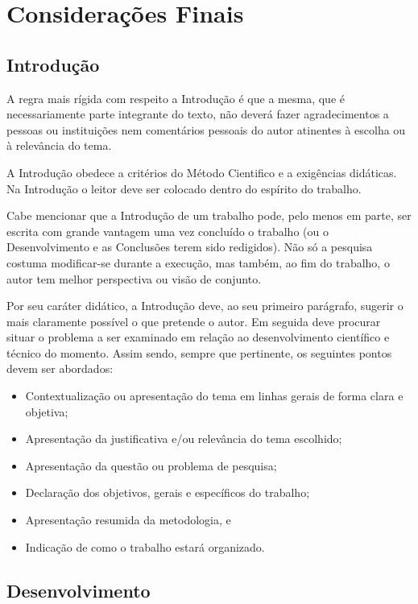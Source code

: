 \chapter[Considerações Finais]{Considerações Finais}

\section{Introdução}

A regra mais rígida com respeito a Introdução é que a mesma, que é 
necessariamente parte integrante do texto, não deverá fazer agradecimentos 
a pessoas ou instituições nem comentários pessoais do autor atinentes à 
escolha ou à relevância do tema.

A Introdução obedece a critérios do Método Cientifico e a exigências 
didáticas. Na Introdução o leitor deve ser colocado dentro do espírito do 
trabalho.

Cabe mencionar que a Introdução de um trabalho pode, pelo menos em parte, 
ser escrita com grande vantagem uma vez concluído o trabalho (ou o 
Desenvolvimento e as Conclusões terem sido redigidos). Não só a pesquisa 
costuma modificar-se durante a execução, mas também, ao fim do trabalho, o 
autor tem melhor perspectiva ou visão de conjunto.

Por seu caráter didático, a Introdução deve, ao seu primeiro parágrafo, 
sugerir o mais claramente possível o que pretende o autor. Em seguida deve 
procurar situar o problema a ser examinado em relação ao desenvolvimento 
científico e técnico do momento. Assim sendo, sempre que pertinente, os 
seguintes pontos devem ser abordados: 

\begin{itemize}

	\item Contextualização ou apresentação do tema em linhas gerais de 
	forma clara e objetiva;
	\item Apresentação da justificativa e/ou relevância do tema escolhido;
	\item Apresentação da questão ou problema de pesquisa;
	\item Declaração dos objetivos, gerais e específicos do trabalho;
	\item Apresentação resumida da metodologia, e
	\item Indicação de como o trabalho estará organizado.

\end{itemize}

\section{Desenvolvimento}

